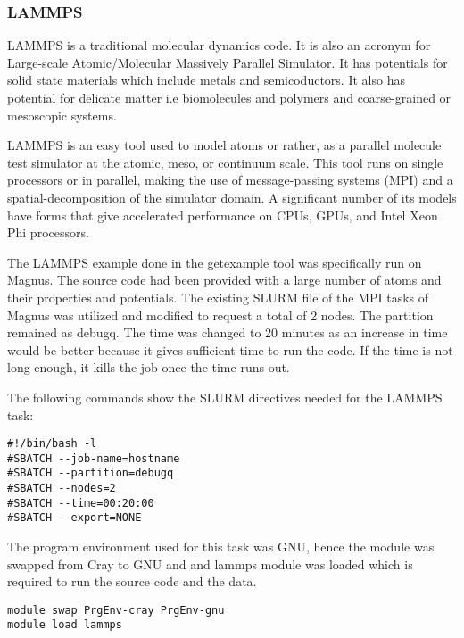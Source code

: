 \subsubsection{LAMMPS}

LAMMPS is a traditional molecular dynamics code. It is also an acronym for Large-scale Atomic/Molecular Massively Parallel Simulator. It has potentials
for solid state materials which include metals and semicoductors. It also has potential for delicate matter i.e biomolecules and polymers and
coarse-grained or mesoscopic systems.

LAMMPS is an easy tool used to model atoms or rather, as a parallel molecule test simulator at the atomic, meso, or continuum scale. This tool runs on
single processors or in parallel, making the use of message-passing systems (MPI) and a spatial-decomposition of the simulator domain. A significant
number of its models have forms that give accelerated performance on CPUs, GPUs, and Intel Xeon Phi processors.

The LAMMPS example done in the getexample tool was specifically run on Magnus. The source code had been provided with a large number of atoms and their
properties and potentials. The existing SLURM file of the MPI tasks of Magnus was utilized and modified to request a total of 2 nodes. The partition
remained as debugq. The time was changed to 20 minutes as an increase in time would be better because it gives sufficient time to run the code. If the 
time is not long enough, it kills the job once the time runs out.

The following commands show the SLURM directives needed for the LAMMPS task:

\begin{tcolorbox}
\begin{Verbatim}[fontsize=\scriptsize]
#!/bin/bash -l
#SBATCH --job-name=hostname
#SBATCH --partition=debugq
#SBATCH --nodes=2
#SBATCH --time=00:20:00
#SBATCH --export=NONE
\end{Verbatim}
\end{tcolorbox}

The program environment used for this task was GNU, hence the module was swapped from Cray to GNU and and lammps module was loaded which is required
to run the source code and the data.

\begin{tcolorbox}
\begin{Verbatim}[fontsize=\scriptsize]
module swap PrgEnv-cray PrgEnv-gnu
module load lammps
\end{Verbatim}
\end{tcolorbox}

